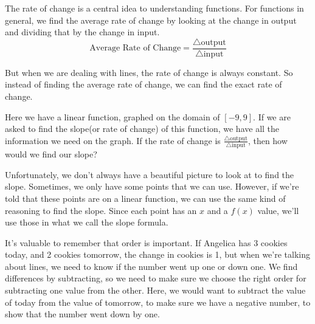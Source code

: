 The rate of change is a central idea to understanding functions. For functions in general, we find the average rate of change by looking at the change in output and dividing that by the change in input.
\[
\text{Average Rate of Change}=\frac{\triangle \text{output}}{\triangle \text{input}}
\]

\noindent
But when we are dealing with lines, the rate of change is always constant. So instead of finding the average rate of change, we can find the exact rate of change. 

\begin{example}\label{Slope on a graph}
	\begin{center}
	\end{center}
	
Here we have a linear function, graphed on the domain of $[-9,9]$. If we are asked to find the slope(or rate of change) of this function, we have all the information we need on the graph. If the rate of change is $\frac{\triangle\text{output}}{\triangle\text{input}}$, then how would we find our slope?
\end{example}


Unfortunately, we don't always have a beautiful picture to look at to find the slope.  Sometimes, we only have some points that we can use.  However, if we're told that these points are on a linear function, we can use the same kind of reasoning to find the slope.  Since each point has an $x$ and a $f(x)$ value, we'll use those in what we call the slope formula.

It's valuable to remember that order is important.  If Angelica has 3 cookies today, and 2 cookies tomorrow, the change in cookies is 1, but when we're talking about lines, we need to know if the number went up one or down one.  We find differences by subtracting, so we need to make sure we choose the right order for subtracting one value from the other.  Here, we would want to subtract the value of today from the value of tomorrow, to make sure we have a negative number, to show that the number went down by one.

